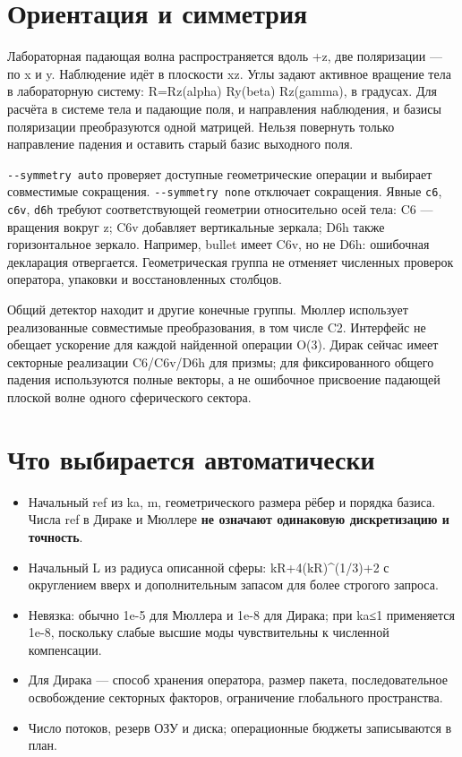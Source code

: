 \documentclass[
  russian,
  11pt,
  a4paper,
]{report}
\newcounter{none} %
\providecommand{\tightlist}{%
  \setlength{\itemsep}{0pt}\setlength{\parskip}{0pt}}
\begin{document}
\section{Ориентация и
симметрия}\label{ux43eux440ux438ux435ux43dux442ux430ux446ux438ux44f-ux438-ux441ux438ux43cux43cux435ux442ux440ux438ux44f}

Лабораторная падающая волна распространяется вдоль +z, две поляризации
--- по x и y. Наблюдение идёт в плоскости xz. Углы задают активное
вращение тела в лабораторную систему: R=Rz(alpha) Ry(beta) Rz(gamma), в
градусах. Для расчёта в системе тела и падающие поля, и направления
наблюдения, и базисы поляризации преобразуются одной матрицей. Нельзя
повернуть только направление падения и оставить старый базис выходного
поля.

\nolinkurl{--symmetry auto} проверяет доступные геометрические операции
и выбирает совместимые сокращения. \nolinkurl{--symmetry none} отключает
сокращения. Явные \nolinkurl{c6}, \nolinkurl{c6v}, \nolinkurl{d6h}
требуют соответствующей геометрии относительно осей тела: C6 ---
вращения вокруг z; C6v добавляет вертикальные зеркала; D6h также
горизонтальное зеркало. Например, bullet имеет C6v, но не D6h: ошибочная
декларация отвергается. Геометрическая группа не отменяет численных
проверок оператора, упаковки и восстановленных столбцов.

Общий детектор находит и другие конечные группы. Мюллер использует
реализованные совместимые преобразования, в том числе C2. Интерфейс не
обещает ускорение для каждой найденной операции O(3). Дирак сейчас имеет
секторные реализации C6/C6v/D6h для призмы; для фиксированного общего
падения используются полные векторы, а не ошибочное присвоение падающей
плоской волне одного сферического сектора.

\section{Что выбирается
автоматически}\label{ux447ux442ux43e-ux432ux44bux431ux438ux440ux430ux435ux442ux441ux44f-ux430ux432ux442ux43eux43cux430ux442ux438ux447ux435ux441ux43aux438}

\begin{itemize}
\tightlist
\item
  Начальный ref из ka, \textbar m\textbar, геометрического размера рёбер
  и порядка базиса. Числа ref в Дираке и Мюллере \textbf{не означают
  одинаковую дискретизацию и точность}.
\item
  Начальный L из радиуса описанной сферы: kR+4(kR)\^{}(1/3)+2 с
  округлением вверх и дополнительным запасом для более строгого запроса.
\item
  Невязка: обычно 1e-5 для Мюллера и 1e-8 для Дирака; при ka≤1
  применяется 1e-8, поскольку слабые высшие моды чувствительны к
  численной компенсации.
\item
  Для Дирака --- способ хранения оператора, размер пакета,
  последовательное освобождение секторных факторов, ограничение
  глобального пространства.
\item
  Число потоков, резерв ОЗУ и диска; операционные бюджеты записываются в
  план.
\end{itemize}
\end{document}
